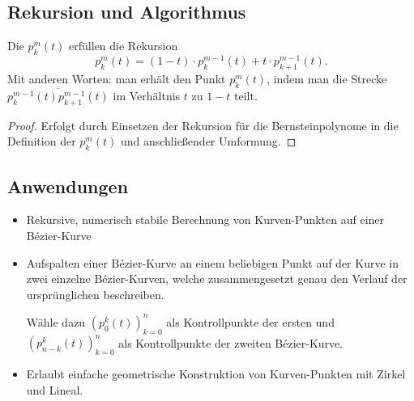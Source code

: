 \documentclass{mywork}
\begin{document}
\subsection*{Rekursion und Algorithmus}

Die $p_k^m(t)$ erfüllen die Rekursion
\[
	p_k^m(t) = (1-t) \cdot p_k^{m-1}(t) + t \cdot p_{k+1}^{m-1}(t).
\]
Mit anderen Worten: man erhält den Punkt $p_k^m(t)$, indem man die Strecke $\overline{p_k^{m-1}(t)p_{k+1}^{m-1}(t)}$ im Verhältnis $t$ zu $1-t$ teilt.

\begin{proof}
	Erfolgt durch Einsetzen der Rekursion für die Bernsteinpolynome in die Definition der $p_k^m(t)$ und anschließender Umformung.
\end{proof}

\newpage

\subsection*{Anwendungen}


\begin{itemize}
	\item
		Rekursive, numerisch stabile Berechnung von Kurven-Punkten auf einer Bézier-Kurve
	\item
		Aufspalten einer Bézier-Kurve an einem beliebigen Punkt auf der Kurve in zwei einzelne Bézier-Kurven, welche zusammengesetzt genau den Verlauf der ursprünglichen beschreiben.

		Wähle dazu $(p_0^k(t))_{k=0}^n$ als Kontrollpunkte der ersten und $(p_{n-k}^k(t))_{k=0}^n$ als Kontrollpunkte der zweiten Bézier-Kurve.
	\item
		Erlaubt einfache geometrische Konstruktion von Kurven-Punkten mit Zirkel und Lineal.
\end{itemize}
\end{document}
